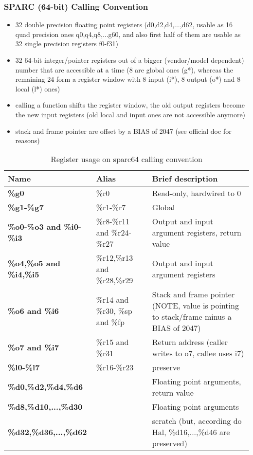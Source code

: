 \subsubsection{SPARC (64-bit) Calling Convention}

\begin{itemize}
\item 32 double precision floating point registers (d0,d2,d4,...,d62, usable as 16 quad precision ones q0,q4,q8,...g60, and also first half of them are usable as 32 single precision registers f0-f31)
\item 32 64-bit integer/pointer registers out of a bigger (vendor/model dependent) number that are accessible at a time (8 are global ones (g*), whereas the remaining 24 form a register window with 8 input (i*), 8 output (o*) and 8 local (l*) ones)
\item calling a function shifts the register window, the old output registers become the new input registers (old local and input ones are not accessible anymore)
\item stack and frame pointer are offset by a BIAS of 2047 (see official doc for reasons)
\end{itemize}

\begin{table}[h]
\begin{tabular*}{0.95\textwidth}{lll}
Name                          & Alias                          & Brief description\\
\hline
{\bf \%g0}                    & \%r0                           & Read-only, hardwired to 0 \\
{\bf \%g1-\%g7}               & \%r1-\%r7                      & Global \\
{\bf \%o0-\%o3 and \%i0-\%i3} & \%r8-\%r11 and \%r24-\%r27     & Output and input argument registers, return value \\
{\bf \%o4,\%o5 and \%i4,\%i5} & \%r12,\%r13 and \%r28,\%r29    & Output and input argument registers \\
{\bf \%o6 and \%i6}           & \%r14 and \%r30, \%sp and \%fp & Stack and frame pointer (NOTE, value is pointing to stack/frame minus a BIAS of 2047) \\
{\bf \%o7 and \%i7}           & \%r15 and \%r31                & Return address (caller writes to o7, callee uses i7) \\
{\bf \%l0-\%l7}               & \%r16-\%r23                    & preserve \\
{\bf \%d0,\%d2,\%d4,\%d6}     &                                & Floating point arguments, return value \\
{\bf \%d8,\%d10,...,\%d30}    &                                & Floating point arguments \\
{\bf \%d32,\%d36,...,\%d62}   &                                & scratch (but, according do Hal, \%d16,...,\%d46 are preserved) \\
\end{tabular*}
\caption{Register usage on sparc64 calling convention}
\end{table}


